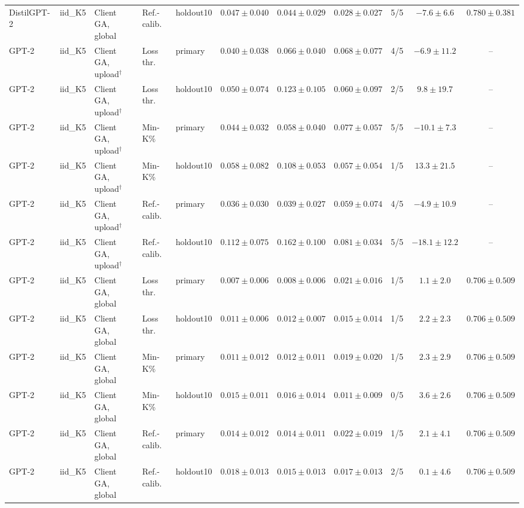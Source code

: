 \begin{table}[t]
\begin{tabular*}{\textwidth}{@{\extracolsep{\fill}}lllllcccccc@{}}
DistilGPT-2 & iid\_K5 & Client GA, global & Ref.-calib. & holdout10 & $0.047 \pm 0.040$ & $0.044 \pm 0.029$ & $0.028 \pm 0.027$ & 5/5 & $-7.6 \pm 6.6$ & $0.780 \pm 0.381$ \\
GPT-2 & iid\_K5 & Client GA, upload$^{\dagger}$ & Loss thr. & primary & $0.040 \pm 0.038$ & $0.066 \pm 0.040$ & $0.068 \pm 0.077$ & 4/5 & $-6.9 \pm 11.2$ & -- \\
GPT-2 & iid\_K5 & Client GA, upload$^{\dagger}$ & Loss thr. & holdout10 & $0.050 \pm 0.074$ & $0.123 \pm 0.105$ & $0.060 \pm 0.097$ & 2/5 & $9.8 \pm 19.7$ & -- \\
GPT-2 & iid\_K5 & Client GA, upload$^{\dagger}$ & Min-K\% & primary & $0.044 \pm 0.032$ & $0.058 \pm 0.040$ & $0.077 \pm 0.057$ & 5/5 & $-10.1 \pm 7.3$ & -- \\
GPT-2 & iid\_K5 & Client GA, upload$^{\dagger}$ & Min-K\% & holdout10 & $0.058 \pm 0.082$ & $0.108 \pm 0.053$ & $0.057 \pm 0.054$ & 1/5 & $13.3 \pm 21.5$ & -- \\
GPT-2 & iid\_K5 & Client GA, upload$^{\dagger}$ & Ref.-calib. & primary & $0.036 \pm 0.030$ & $0.039 \pm 0.027$ & $0.059 \pm 0.074$ & 4/5 & $-4.9 \pm 10.9$ & -- \\
GPT-2 & iid\_K5 & Client GA, upload$^{\dagger}$ & Ref.-calib. & holdout10 & $0.112 \pm 0.075$ & $0.162 \pm 0.100$ & $0.081 \pm 0.034$ & 5/5 & $-18.1 \pm 12.2$ & -- \\
GPT-2 & iid\_K5 & Client GA, global & Loss thr. & primary & $0.007 \pm 0.006$ & $0.008 \pm 0.006$ & $0.021 \pm 0.016$ & 1/5 & $1.1 \pm 2.0$ & $0.706 \pm 0.509$ \\
GPT-2 & iid\_K5 & Client GA, global & Loss thr. & holdout10 & $0.011 \pm 0.006$ & $0.012 \pm 0.007$ & $0.015 \pm 0.014$ & 1/5 & $2.2 \pm 2.3$ & $0.706 \pm 0.509$ \\
GPT-2 & iid\_K5 & Client GA, global & Min-K\% & primary & $0.011 \pm 0.012$ & $0.012 \pm 0.011$ & $0.019 \pm 0.020$ & 1/5 & $2.3 \pm 2.9$ & $0.706 \pm 0.509$ \\
GPT-2 & iid\_K5 & Client GA, global & Min-K\% & holdout10 & $0.015 \pm 0.011$ & $0.016 \pm 0.014$ & $0.011 \pm 0.009$ & 0/5 & $3.6 \pm 2.6$ & $0.706 \pm 0.509$ \\
GPT-2 & iid\_K5 & Client GA, global & Ref.-calib. & primary & $0.014 \pm 0.012$ & $0.014 \pm 0.011$ & $0.022 \pm 0.019$ & 1/5 & $2.1 \pm 4.1$ & $0.706 \pm 0.509$ \\
GPT-2 & iid\_K5 & Client GA, global & Ref.-calib. & holdout10 & $0.018 \pm 0.013$ & $0.015 \pm 0.013$ & $0.017 \pm 0.013$ & 2/5 & $0.1 \pm 4.6$ & $0.706 \pm 0.509$ \\

\end{tabular*}
\end{table}
